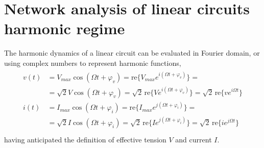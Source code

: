 \documentclass[letterpaper,10pt,italian]{jupyterBook}
\begin{document}
\section{Network analysis of linear circuits \sphinxhyphen{} harmonic regime}
\label{\detokenize{ch/electrical-engineering-networks-harmonic:network-analysis-of-linear-circuits-harmonic-regime}}\label{\detokenize{ch/electrical-engineering-networks-harmonic:classical-electromagnetism-electrical-engineering-newtork-analysis-harmonic}}\label{\detokenize{ch/electrical-engineering-networks-harmonic::doc}}
\sphinxAtStartPar
The harmonic dynamics of a linear circuit can be evaluated in Fourier domain, or using complex numbers to represent harmonic functions,
\begin{equation*}
\begin{split}\begin{aligned}
  v(t) & = V_{max} \cos (\Omega t + \varphi_v) = \text{re} \{ V_{max} e^{i (\Omega t + \varphi_v)} \} = \\
       & = \sqrt{2} V \cos (\Omega t + \varphi_v) = \sqrt{2} \, \text{re} \{ V e^{i (\Omega t + \varphi_v)} \} = \sqrt{2} \, \text{re} \{ v e^{i \Omega t} \} \\
  i(t) & = I_{max} \cos (\Omega t + \varphi_i) = \text{re} \{ I_{max} e^{j (\Omega t + \varphi_i)} \} = \\
       & = \sqrt{2} I \cos (\Omega t + \varphi_i) = \sqrt{2} \, \text{re} \{ I e^{j (\Omega t + \varphi_i)} \} = \sqrt{2} \, \text{re} \{ i e^{j \Omega t} \} \\
\end{aligned}\end{split}
\end{equation*}
\sphinxAtStartPar
having anticipated the definition {\hyperref[\detokenize{ch/electrical-engineering-networks-harmonic:harmonic:effective-values}]{}} of effective tension \(V\) and current \(I\).
\end{document}
